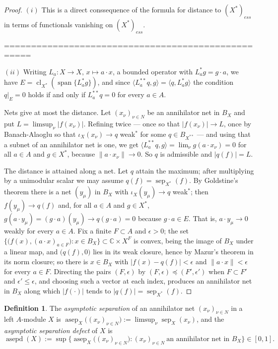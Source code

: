 \documentclass[11pt]{article}
\theoremstyle{plain}
\theoremstyle{definition}
\newtheorem{definition}[theorem]{Definition}
\DeclareMathOperator{\sep}{sep}
\DeclareMathOperator{\asep}{asep}
\DeclareMathOperator{\asepd}{asepd}
\begin{document}
\begin{proof}
$(i)$ This is a direct conssequence of the formula for distance to ${(X^*)}_{ess}$ 
in terms of functionals vanishing on ${(X^*)}_{ess}$. 

===================================================

$(ii)$ Writing  $L_a:X\to X,\,x\mapsto a\cdot x$, a bounded operator 
with $L_a^*g=g\cdot a$, we have $E=\operatorname{cl}_{X^*}(\operatorname{span} \{L_a^*g \})$, and since
$\langle L_a^{**}q,g\rangle=\langle q,L_a^*g\rangle$ the condition $q|_E=0$
holds if and only if $L_a^{**}q=0$ for every $a\in A$.

Nets give at most the distance. Let ${(x_\nu)}_{\nu\in N}$ be an annihilator net
in $B_X$ and put $L=\limsup_\nu|f(x_\nu)|$. Refining twice --- once so that
$|f(x_\nu)|\to L$, once by Banach-Alaoglu so that $\iota_X(x_\nu)\to q$
weak${}^*$ for some $q\in B_{X^{**}}$ --- and using that a subnet of an
annihilator net is one, we get
$\langle L_a^{**}q,g\rangle=\lim_\nu g(a\cdot x_\nu)=0$ for all $a\in A$ and
$g\in X^*$, because $\lVert a\cdot x_\nu\rVert\to 0$. So $q$ is admissible and
$|q(f)|=L$.

The distance is attained along a net. Let $q$ attain the maximum; after
multiplying by a unimodular scalar we may assume $q(f)=\sep_{X^*}(f)$. By
Goldstine's theorem there is a net ${(y_\mu)}$ in $B_X$ with
$\iota_X(y_\mu)\to q$ weak${}^*$; then $f(y_\mu)\to q(f)$ and, for all $a\in A$
and $g\in X^*$, $g(a\cdot y_\mu)=(g\cdot a)(y_\mu)\to q(g\cdot a)=0$ because
$g\cdot a\in E$. That is, $a\cdot y_\mu\to 0$ weakly for every $a\in A$. Fix a
finite $F\subset A$ and $\epsilon>0$; the set
$ \{ \bigl(f(x),{(a\cdot x)}_{a\in F} \bigr):x\in B_X \}
\subset\mathbb{C}\times X^F$ is convex, being the image of $B_X$ under a linear
map, and $\bigl(q(f),0\bigr)$ lies in its weak closure, hence by Mazur's theorem
in its norm closure; so there is $x\in B_X$ with $|f(x)-q(f)|<\epsilon$ and
$\lVert a\cdot x\rVert<\epsilon$ for every $a\in F$. Directing the pairs
$(F,\epsilon)$ by $(F,\epsilon)\preceq(F',\epsilon')$ when $F\subset F'$ and
$\epsilon'\leq\epsilon$, and choosing such a vector at each index, produces an
annihilator net in $B_X$ along which $|f(\cdot)|$ tends to
$|q(f)|=\sep_{X^*}(f)$.
\end{proof}

\begin{definition}\label{AsympSepOfMod}
The \emph{asymptotic separation} of an annihilator net ${(x_\nu)}_{\nu\in N}$ in
a left $A$-module $X$ is
$\asep_X \bigl({(x_\nu)}_{\nu\in N} \bigr):=\limsup_\nu\sep_X(x_\nu)$, and the
\emph{asymptotic separation defect} of $X$ is
\[
\asepd(X):=\sup \bigl\{
  \asep_X \bigl({(x_\nu)}_{\nu\in N} \bigr):
  {(x_\nu)}_{\nu\in N}\ \text{an annihilator net in }B_X
 \bigr\}\in[0,1].
\]
\end{definition}
\end{document}
